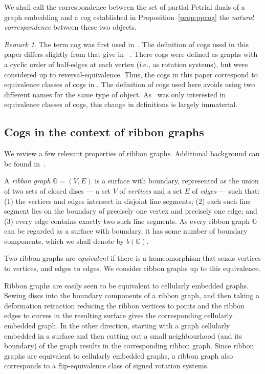 \documentclass{amsart}
\newcommand{\bG}{\mathbb{G}}
\theoremstyle{definition}
\theoremstyle{remark}
\newtheorem{remark}[theorem]{Remark}
\numberwithin{equation}{section}
\begin{document}
We shall call the correspondence between the set of partial Petrial duals of a graph embedding and a cog established in Proposition~\ref{prop:ppcog} the \emph{natural correspondence} between these two objects.



\begin{remark}
The term cog was first used in~\cite[Section 3.2]{MR3086663}.  The definition of cogs used in this paper differs slightly from that give in ~\cite{MR3086663}.
There cogs were defined as graphs with a cyclic order of half-edges at each vertex (i.e., as rotation systems), but were considered up to reversal-equivalence. Thus, the cogs in this paper correspond to equivalence classes of cogs in \cite{MR3086663}. The definition of cogs used here avoids using two different names for the same type of object. As~\cite{MR3086663} was only interested in equivalence classes of cogs, this change in definitions is largely immaterial. 
\end{remark}


\subsection{Cogs in the context of ribbon graphs}\label{ss:cogrg} 
We review  a few relevant properties of ribbon graphs.   Additional background can be found in~\cite{MR3086663,zbMATH07553843}.

 A {\em ribbon graph} $\bG=\left(V,E\right)$ is a surface with boundary, represented as the union of two sets of closed discs --- a set $V$ of {\em vertices} and a set $E$ of {\em edges} --- such that: (1) the vertices and edges intersect in disjoint line segments; (2) each such line segment lies on the boundary of precisely one vertex and precisely one edge; and (3) every edge contains exactly two such line segments. 
As every ribbon graph $\bG$ can be regarded as a surface with boundary, it has some number of boundary components, which we shall denote by $b(\bG)$.
  

Two ribbon graphs are \emph{equivalent} if there is a homeomorphism that sends vertices to vertices, and edges to edges. We consider ribbon graphs up to this equivalence. 

Ribbon graphs are easily seen to be equivalent to cellularly embedded graphs.  Sewing discs into the boundary components of a ribbon graph, and then taking a deformation retraction reducing the ribbon vertices to points and the ribbon edges to curves in the resulting surface gives the corresponding cellularly embedded graph.  In the other direction, starting with a graph cellularly embedded in a surface and then cutting out a small neighbourhood (and its boundary) of the graph results in the corresponding ribbon graph.
Since ribbon graphs are equivalent to cellularly embedded graphs, a ribbon graph also corresponds to a flip-equivalence class of signed rotation systems.
\end{document}
